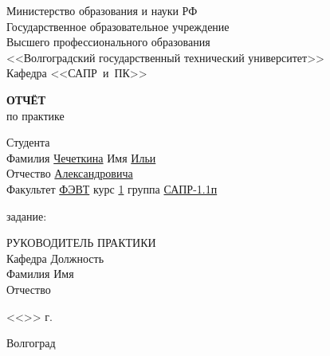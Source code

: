 \begin{titlepage}
    \begin{center}
        Министерство образования и науки РФ \\
        Государственное образовательное учреждение\\
        Высшего профессионального образования\\
        <<Волгоградский государственный технический университет>>\\
        Кафедра <<САПР~и~ПК>>
    \end{center}
    \vspace{2.0cm}
    \begin{center}
        \large \textbf{ОТЧЁТ} \\
        по практике
    \end{center}
    \begin{flushleft}
        Студента\\
        Фамилия \underline{Чечеткина\hspace{2.6cm}}
        Имя \underline{Ильи\hspace{3.5cm}}\\
        Отчество \underline{Александровича\hspace{1.33cm}}\\
        Факультет \underline{ФЭВТ\hspace{3.23cm}} курс \underline{1\hspace{.8cm}}
        группа \underline{САПР-1.1п\hspace{2.2cm}}\\
    \end{flushleft}
    \vspace{1.0cm}
     задание: \underline{\hspace{11.25cm}}\\
    \underline{\hspace{\textwidth}}
    \vspace{1.0cm}
    \begin{flushleft}
        РУКОВОДИТЕЛЬ ПРАКТИКИ\\
        Кафедра \underline{\hspace{5cm}} Должность \underline{\hspace{5cm}} \\
        Фамилия \underline{\hspace{5cm}} Имя \underline{\hspace{6.5cm}}\\
        Отчество \underline{\hspace{5cm}}
    \end{flushleft}
    \vspace{1.5cm}
    \begin{flushright}
        <<\underline{\hspace{1.0cm}}>>\underline{\hspace{4.0cm}} \the\year г.
    \end{flushright}
    \vspace{\fill}
    \begin{center}
        Волгоград \the\year
    \end{center}
\end{titlepage}
